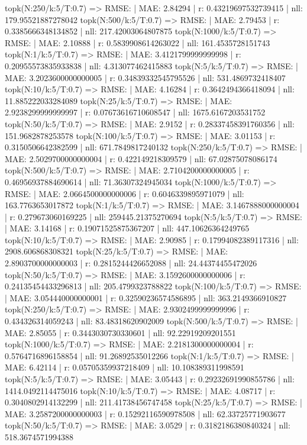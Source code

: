 topk(N:250/k:5/T:0.7) => RMSE: | MAE: 2.84294 | r: 0.43219697532739415 | nll: 179.95521887278042
topk(N:500/k:5/T:0.7) => RMSE: | MAE: 2.79453 | r: 0.3385666348134852 | nll: 217.42003064807875
topk(N:1000/k:5/T:0.7) => RMSE: | MAE: 2.10888 | r: 0.5839908614263022 | nll: 161.4535728151743
topk(N:1/k:5/T:0.7) => RMSE: | MAE: 3.4121799999999998 | r: 0.20955573835933838 | nll: 4.313077462415883
topk(N:5/k:5/T:0.7) => RMSE: | MAE: 3.2023600000000005 | r: 0.34839332545795526 | nll: 531.4869732418407
topk(N:10/k:5/T:0.7) => RMSE: | MAE: 4.16284 | r: 0.3642494366418094 | nll: 11.885222033284089
topk(N:25/k:5/T:0.7) => RMSE: | MAE: 2.9238299999999997 | r: 0.07673616710608547 | nll: 1675.6167203531752
topk(N:50/k:5/T:0.7) => RMSE: | MAE: 2.9152 | r: 0.28337458391760356 | nll: 151.9682878253578
topk(N:100/k:5/T:0.7) => RMSE: | MAE: 3.01153 | r: 0.3150506642382599 | nll: 671.7849817240132
topk(N:250/k:5/T:0.7) => RMSE: | MAE: 2.5029700000000004 | r: 0.422149218309579 | nll: 67.02875078086174
topk(N:500/k:5/T:0.7) => RMSE: | MAE: 2.7104200000000005 | r: 0.46956937884690614 | nll: 71.36307324945034
topk(N:1000/k:5/T:0.7) => RMSE: | MAE: 2.0664500000000006 | r: 0.6046339895971079 | nll: 163.7763653017872
topk(N:1/k:5/T:0.7) => RMSE: | MAE: 3.1467888000000004 | r: 0.279673060169225 | nll: 259445.21375270694
topk(N:5/k:5/T:0.7) => RMSE: | MAE: 3.14168 | r: 0.19071525875367207 | nll: 447.10626364249765
topk(N:10/k:5/T:0.7) => RMSE: | MAE: 2.90985 | r: 0.17994082389117316 | nll: 2908.606868308321
topk(N:25/k:5/T:0.7) => RMSE: | MAE: 2.8903700000000003 | r: 0.2815244426652088 | nll: 24.44374455472026
topk(N:50/k:5/T:0.7) => RMSE: | MAE: 3.1592600000000006 | r: 0.24135454433296813 | nll: 205.4799323788822
topk(N:100/k:5/T:0.7) => RMSE: | MAE: 3.054440000000001 | r: 0.32590236574586895 | nll: 363.2149366910827
topk(N:250/k:5/T:0.7) => RMSE: | MAE: 2.9302499999999996 | r: 0.434326314059243 | nll: 83.48318620902009
topk(N:500/k:5/T:0.7) => RMSE: | MAE: 2.85055 | r: 0.3443030730330601 | nll: 92.22919209201551
topk(N:1000/k:5/T:0.7) => RMSE: | MAE: 2.2181300000000004 | r: 0.5764716896158854 | nll: 91.26892535012266
topk(N:1/k:5/T:0.7) => RMSE: | MAE: 6.42114 | r: 0.05705359937218409 | nll: 10.108389311998591
topk(N:5/k:5/T:0.7) => RMSE: | MAE: 3.05443 | r: 0.29232691990855786 | nll: 1414.0492114475016
topk(N:10/k:5/T:0.7) => RMSE: | MAE: 4.08717 | r: 0.3040802914132299 | nll: 211.41738456747458
topk(N:25/k:5/T:0.7) => RMSE: | MAE: 3.2587200000000003 | r: 0.15292116590978508 | nll: 62.33725771903677
topk(N:50/k:5/T:0.7) => RMSE: | MAE: 3.0529 | r: 0.3182186380840324 | nll: 518.3674571994388
